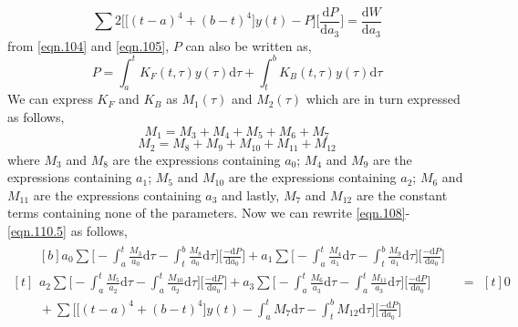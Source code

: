 \documentclass[letterpaper%
, twoside%
, 12pt%
,memoire%
, english%
,creativecommons,hyperref%
]{thETS}
\theoremstyle{newThmStyle}
\begin{document}
\begin{equation}\label{eqn.110.5}
\sum 2\bigg[\big[(t-a)^4 + (b-t)^4\big]y(t) - P\bigg] \bigg[\frac{\mathrm{d}P}{\mathrm{d}a_{3}}\bigg] = \frac{\mathrm{d}W}{\mathrm{d}a_{3}} 
\end{equation}
from \eqref{eqn.104} and \eqref{eqn.105}, $P$ can also be written as,
\begin{equation}\label{eqn.111}
P = \int_{a}^{t} K_{F}(t,\tau)y(\tau)\mathrm{d}\tau + \int_{t}^{b} K_{B}(t,\tau)y(\tau)\mathrm{d}\tau
\end{equation}
We can express $K_{F}$ and $K_{B}$ as $M_{1}(\tau)$ and $M_{2}(\tau)$ which are in turn expressed as follows,
\begin{equation}\label{eqn.112}
M_{1} = M_{3} + M_{4} + M_{5} + M_{6} + M_{7}
\end{equation}
\begin{equation}\label{eqn.113}
M_{2} = M_{8} + M_{9} + M_{10} + M_{11} + M_{12}
\end{equation}
where $M_{3}$ and $M_{8}$ are the expressions containing $a_{0}$; $M_{4}$ and $M_{9}$ are the expressions containing $a_{1}$; $M_{5}$ and $M_{10}$ are the expressions containing $a_{2}$; $M_{6}$ and $M_{11}$ are the expressions containing $a_{3}$ and lastly, $M_{7}$ and $M_{12}$ are the constant terms containing none of the parameters. Now we can rewrite  \eqref{eqn.108}- \eqref{eqn.110.5} as follows, 
\begin{equation}\label{eqn.114}
\begin{aligned}[t]
	\begin{aligned}[b]
	a_{0} \sum \bigg[-\int_{a}^{t}\frac{M_{3}}{a_{0}}\mathrm{d}\tau-\int_{t}^{b}\frac{M_{8}}{a_{0}}\mathrm{d}\tau\bigg] \bigg[\frac{-\mathrm{d}P}{\mathrm{d}a_{0}}\bigg] + a_{1} \sum \bigg[-\int_{a}^{t}\frac{M_{4}}{a_{1}}\mathrm{d}\tau-\int_{t}^{b}\frac{M_{9}}{a_{1}}\mathrm{d}\tau\bigg] \bigg[\frac{-\mathrm{d}P}{\mathrm{d}a_{0}}\bigg] \\
	a_{2} \sum \bigg[-\int_{a}^{t}\frac{M_{5}}{a_{2}}\mathrm{d}\tau-\int_{a}^{t}\frac{M_{10}}{a_{2}}\mathrm{d}\tau\bigg] \bigg[\frac{-\mathrm{d}P}{\mathrm{d}a_{0}}\bigg] + a_{3} \sum \bigg[-\int_{a}^{t}\frac{M_{6}}{a_{3}}\mathrm{d}\tau-\int_{a}^{t}\frac{M_{11}}{a_{3}}\mathrm{d}\tau\bigg] \bigg[\frac{-\mathrm{d}P}{\mathrm{d}a_{0}}\bigg] \\ 
	{} +\sum\bigg[\big[(t-a)^4+(b-t)^4\big]y(t) -\int_{a}^{t}{M_{7}}\mathrm{d}\tau-\int_{t}^{b}{M_{12}}\mathrm{d}\tau \bigg]\bigg[\frac{-\mathrm{d}P}{\mathrm{d}a_{0}}\bigg]
	\end{aligned}
	& =
	\begin{aligned}[t]
	0
	\end{aligned}
\end{aligned}
\end{equation}
\end{document}
